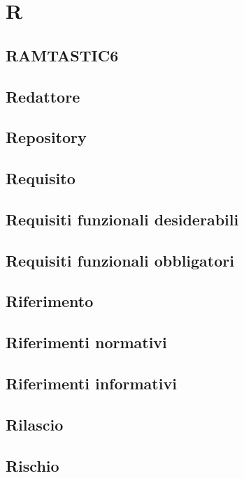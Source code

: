 \section{R} 
\subsection{RAMTASTIC6} 

\subsection{Redattore} 

\subsection{Repository} 

\subsection{Requisito} 

\subsection{Requisiti funzionali desiderabili} 

\subsection{Requisiti funzionali obbligatori} 

\subsection{Riferimento} 

\subsection{Riferimenti normativi} 

\subsection{Riferimenti informativi} 

\subsection{Rilascio} 

\subsection{Rischio} 

